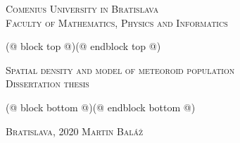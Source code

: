 \begin{titlepage}    
    \begin{center}
        {
            \Large
            \textsc{Comenius University in Bratislava}\\[2mm]
            \textsc{Faculty of Mathematics, Physics and Informatics}\\[12mm]
        }
                
		(@ block top @)(@ endblock top @)

        {
            \linespread{1.2}
            \fontsize{30}{30}\selectfont
            \textsc{Spatial density and model of meteoroid population}\\[10mm]
            
            \large
            \textsc{Dissertation thesis}
        }        
        
		(@ block bottom @)(@ endblock bottom @)

        \vfill
		{						
            \large
			\textsc{Bratislava}, 2020 \hfill \textsc{Martin Baláž}
		}
    \end{center}
\end{titlepage}
